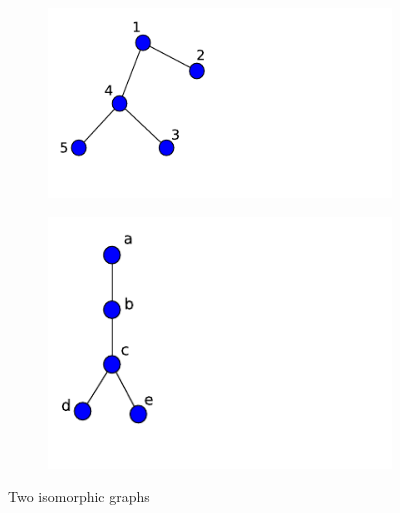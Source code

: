 \documentclass[10pt,a4paper]{article}
\begin{document}
     	\begin{figure}[!h]
     	\centering
     	\begin{subfigure}[b]{0.35\textwidth}
     		\includegraphics[width=\textwidth]{images/graph-isomorphism1.pdf}
     		\caption{}
     		\label{isomorphic1}
     	\end{subfigure}
     	\begin{subfigure}[b]{0.35\textwidth}
     		\includegraphics[width=\textwidth]{images/graph-isomorphism2.pdf}
     		\caption{}
     		\label{isomorphic2}
     	\end{subfigure} 
     	\caption{Two isomorphic graphs} 
     	\label{isomorphism}
     \end{figure}
 
\end{document}
